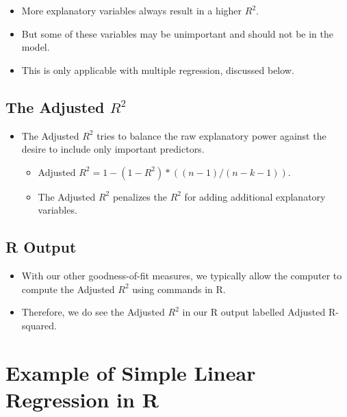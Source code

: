 \documentclass[
  letterpaper,
  DIV=11,
  numbers=noendperiod]{scrreprt}
\providecommand{\tightlist}{%
  \setlength{\itemsep}{0pt}\setlength{\parskip}{0pt}}\usepackage{longtable,booktabs,array}
\begin{document}
\begin{itemize}
\tightlist
\item
  More explanatory variables always result in a higher \(R^2\).
\item
  But some of these variables may be unimportant and should not be in
  the model.
\item
  This is only applicable with multiple regression, discussed below.
\end{itemize}

\subsection{\texorpdfstring{The Adjusted
\(R^2\)}{The Adjusted R\^{}2}}\label{the-adjusted-r2}

\begin{itemize}
\tightlist
\item
  The Adjusted \(R^2\) tries to balance the raw explanatory power
  against the desire to include only important predictors.

  \begin{itemize}
  \tightlist
  \item
    Adjusted \(R^2 = 1-(1-R^2)*((n-1)/(n-k-1))\).
  \item
    The Adjusted \(R^2\) penalizes the \(R^2\) for adding additional
    explanatory variables.
  \end{itemize}
\end{itemize}

\subsection{R Output}\label{r-output-2}

\begin{itemize}
\tightlist
\item
  With our other goodness-of-fit measures, we typically allow the
  computer to compute the Adjusted \(R^2\) using commands in R.\\
\item
  Therefore, we do see the Adjusted \(R^2\) in our R output labelled
  Adjusted R-squared.
\end{itemize}

\section{Example of Simple Linear Regression in
R}\label{example-of-simple-linear-regression-in-r}
\end{document}

